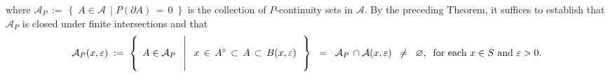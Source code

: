 where \;$\mathcal{A}_{P} \,:=\, \left\{\;A \in \mathcal{A}\;\,\vert\; P(\partial A) \,=\,0 \;\right\}$\;
is the collection of $P$-continuity sets in $\mathcal{A}$.
\vskip0.2cm
\noindent
By the preceding Theorem, it suffices to establish that
$\mathcal{A}_{P}$ is closed under finite intersections and that
\begin{equation*}
\mathcal{A}_{P}(x,\varepsilon)
\; := \;
	\left\{\;\,
	A \in \mathcal{A}_{P}
	\;\;\left\vert\;
	\begin{array}{c}
		\\
		x \,\in\, A^{\circ} \,\subset\, A \,\subset\, B(x,\varepsilon)
		\\ \\
	\end{array}
	\right.
	\right\}
\;\; = \;\; \mathcal{A}_{P}\,\cap\mathcal{A}(x,\varepsilon)
\;\;\neq\;\; \varnothing, 
\;\;\textnormal{for each $x \in S$ and $\varepsilon > 0$}.
\end{equation*}

